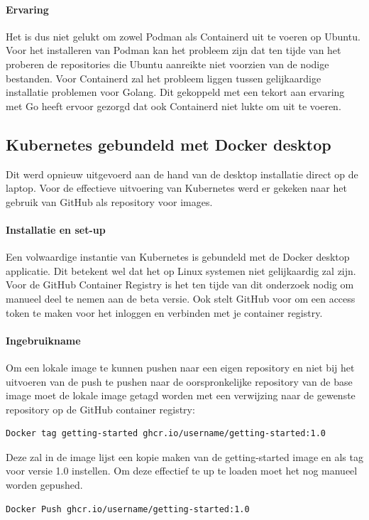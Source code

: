 \paragraph{Ervaring}
Het is dus niet gelukt om zowel Podman als Containerd uit te voeren op Ubuntu. Voor het installeren van Podman kan het probleem zijn dat ten tijde van het proberen de repositories die Ubuntu aanreikte niet voorzien van de nodige bestanden. Voor Containerd zal het probleem liggen tussen gelijkaardige installatie problemen voor Golang. Dit gekoppeld met een tekort aan ervaring met Go heeft ervoor gezorgd dat ook Containerd niet lukte om uit te voeren.

\subsection{Kubernetes gebundeld met Docker desktop}
Dit werd opnieuw uitgevoerd aan de hand van de desktop installatie direct op de laptop. Voor de effectieve uitvoering van Kubernetes werd er gekeken naar het gebruik van GitHub als repository voor images.
\paragraph{Installatie en set-up}
Een volwaardige instantie van Kubernetes is gebundeld met de Docker desktop applicatie. Dit betekent wel dat het op Linux systemen niet gelijkaardig zal zijn.
Voor de GitHub Container Registry is het ten tijde van dit onderzoek nodig om manueel deel te nemen aan de beta versie. Ook stelt GitHub voor om een access token te maken voor het inloggen en verbinden met je container registry.

\paragraph{Ingebruikname}
Om een lokale image te kunnen pushen naar een eigen repository en niet bij het uitvoeren van de push te pushen naar de oorspronkelijke repository van de base image moet de lokale image getagd worden met een verwijzing naar de gewenste repository op de GitHub container registry:
\begin{verbatim}
Docker tag getting-started ghcr.io/username/getting-started:1.0
\end{verbatim}

Deze zal in de image lijst een kopie maken van de getting-started image en als tag voor versie 1.0 instellen. Om deze effectief te up te loaden moet het nog manueel worden gepushed.
\begin{verbatim}
Docker Push ghcr.io/username/getting-started:1.0
\end{verbatim}

